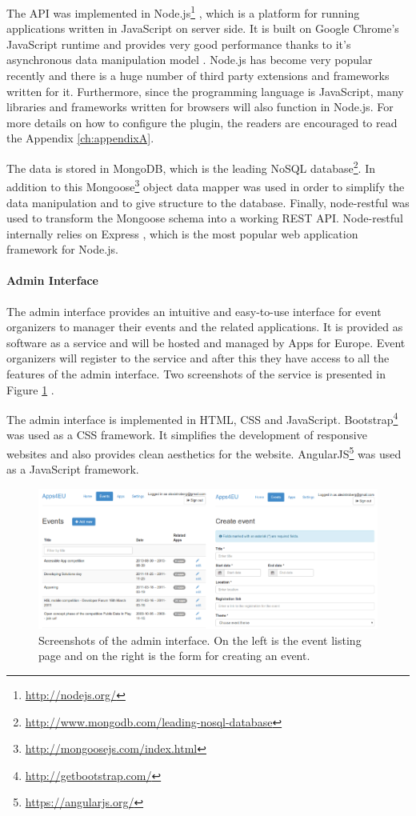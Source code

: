 The API was implemented in Node.js\footnote{\url{http://nodejs.org/}} , which is a platform for running applications written in JavaScript on server side. It is built on Google Chrome's JavaScript runtime and provides very good performance thanks to it's asynchronous data manipulation model . Node.js has become very popular recently and there is a huge number of third party extensions and frameworks written for it. Furthermore, since the programming language is JavaScript, many libraries and frameworks written for browsers will also function in Node.js. For more details on how to configure the plugin, the readers are encouraged to read the Appendix \ref{ch:appendixA}.

The data is stored in MongoDB, which is the leading NoSQL database\footnote{\url{http://www.mongodb.com/leading-nosql-database}}. In addition to this Mongoose\footnote{\url{http://mongoosejs.com/index.html}} object data mapper  was used in order to simplify the data manipulation and to give structure to the database. Finally, node-restful  was used to transform the Mongoose schema into a working REST API. Node-restful internally relies on Express , which is the most popular web application framework for Node.js.

\paragraph{Admin Interface}
The admin interface provides an intuitive and easy-to-use interface for event organizers to manager their events and the related applications. It is provided as software as a service and will be hosted and managed by Apps for Europe. Event organizers will register to the service and after this they have access to all the features of the admin interface. Two screenshots of the service is presented in Figure \ref{fig:adminInterface} .


The admin interface is implemented in HTML, CSS and JavaScript. Bootstrap\footnote{\url{http://getbootstrap.com/}}  was used as a CSS framework. It simplifies the development of responsive websites and also provides clean aesthetics for the website. AngularJS\footnote{\url{https://angularjs.org/}}  was used as a JavaScript framework.

\begin{figure}[ht!]
\includegraphics[scale=0.95]{img/adminInterface.pdf}
\caption{Screenshots of the admin interface. On the left is the event listing
 page and on the right is the form for creating an event.}
 \label{fig:adminInterface}
\end{figure}


